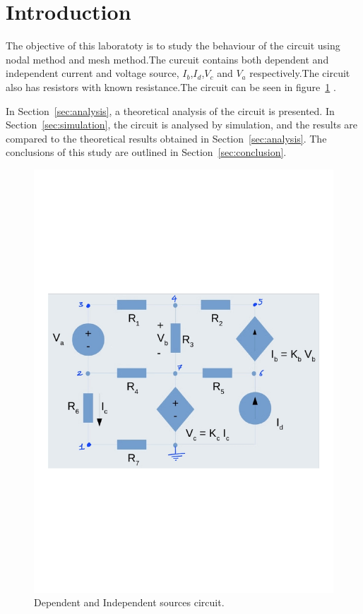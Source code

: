 \section{Introduction}
\label{sec:Introduction}

The objective of this laboratoty is to study the behaviour of the circuit using nodal method and mesh method.The curcuit contains both dependent and independent current and voltage source, $I_b$,$I_d$,$V_c$ and $V_a$ respectively.The circuit also has resistors with known resistance.The circuit can be seen in figure~\ref{fig:rc} .



In Section~\ref{sec:analysis}, a theoretical analysis of the circuit is
presented. In Section~\ref{sec:simulation}, the circuit is analysed by
simulation, and the results are compared to the theoretical results obtained in
Section~\ref{sec:analysis}. The conclusions of this study are outlined in
Section~\ref{sec:conclusion}.

\begin{figure}[h] \centering
\includegraphics[width=0.7\linewidth]{rc}
\caption{Dependent and Independent sources circuit.}
\label{fig:rc}
\end{figure}

